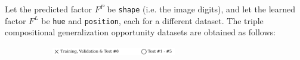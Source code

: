 \begin{dataset}
\begin{figure}[H]
\begin{subfigure}[b]{0.45\textwidth}
\begin{subfigure}[b]{0.48\textwidth}
            \end{subfigure}
        \end{subfigure}
    \end{figure}
\end{dataset}


\begin{dataset}\label{def:3_cgo_experiments}
    Let the predicted factor $F^P$ be \texttt{shape} (i.e. the image digits), and let the 
    learned factor $F^L$ be \texttt{hue} and \texttt{position}, each for a different dataset. The 
    triple compositional generalization opportunity datasets are obtained as follows:

    \begin{figure}[H]
        \centering
        \begin{subfigure}[b]{\textwidth}
            \centering
            \includegraphics[width=0.6\textwidth]{img/datasets/_legend.pdf}
        \end{subfigure}
        \vspace{-0.2cm} %


\end{figure}
\end{dataset}
